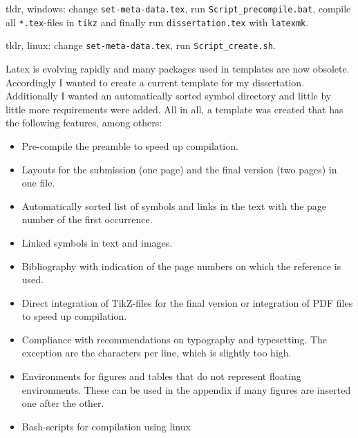 
tldr, windows: change \texttt{set-meta-data.tex}, run \texttt{Script\_precompile.bat}, compile all \texttt{*.tex}-files in \texttt{tikz} and finally run \texttt{dissertation.tex} with \texttt{latexmk}.

tldr, linux: change \texttt{set-meta-data.tex}, run \texttt{Script\_create.sh}.

Latex is evolving rapidly and many packages used in templates are now obsolete. Accordingly I wanted to create a current template for my dissertation. Additionally I wanted an automatically sorted symbol directory and little by little more requirements were added. All in all, a template was created that has the following features, among others:

\begin{itemize}
	\item Pre-compile the preamble to speed up compilation.
	\item Layouts for the submission (one page) and the final version (two pages) in one file.
	\item Automatically sorted list of symbols and links in the text with the page number of the first occurrence.
	\item Linked symbols in text and images.
	\item Bibliography with indication of the page numbers on which the reference is used.
	\item Direct integration of TikZ-files for the final version or integration of PDF files to speed up compilation.
	\item Compliance with recommendations on typography and typesetting. The exception are the characters per line, which is slightly too high.
	\item Environments for figures and tables that do not represent floating environments. These can be used in the appendix if many figures are inserted one after the other.
	\item Bash-scripts for compilation using linux
\end{itemize}